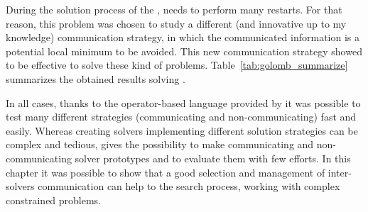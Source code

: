 During the solution process of the \grp{}, \posl{} needs to perform many restarts. For that reason, this problem was chosen to study a different (and innovative up to my knowledge) communication strategy, in which the communicated information is a potential local minimum to be avoided. This new communication strategy showed to be effective to solve these kind of problems. Table~\ref{tab:golomb_summarize} summarizes the obtained results solving \GRP.

\begin{table}[h]
\captionsetup{belowskip=6pt,aboveskip=6pt}
\centering 
\renewcommand{\arraystretch}{1}
\caption{Summarizing results for \GRP{}}
\label{tab:golomb_summarize}
\end{table}

In all cases, thanks to the operator-based language provided by \posl{} it was possible to test many different strategies (communicating and non-communicating) fast and easily. Whereas creating solvers implementing different solution strategies can be complex and tedious, \posl{} gives the possibility to make communicating and non-communicating solver prototypes and to evaluate them with few efforts. In this chapter it was possible to show that a good selection and management of inter-solvers communication can %
help to the search process, working with complex constrained problems.

